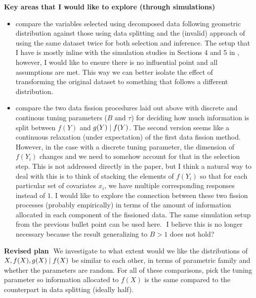 \textbf{Key areas that I would like to explore (through simulations)}
\begin{itemize}
\item compare the variables selected using decomposed data following geometric distribution against those using data splitting and the (invalid) approach of using the same dataset twice for both selection and inference. The setup that I have is mostly inline with the simulation studies in Sections 4 and 5 in \cite{leiner2022data}, however, I would like to ensure there is no influential point and all assumptions are met. This way we can better isolate the effect of transforming the original dataset to something that follows a different distribution.
\item compare the two data fission procedures laid out above with discrete and continous tuning parameters ($B$ and $\tau$) for deciding how much information is split between $f(Y)$ and $g(Y)\mid f(Y)$. The second version seems like a continuous relaxation (under expectation) of the first data fission method. However, in the case with a discrete tuning parameter, the dimension of $f(Y_i)$ changes and we need to somehow account for that in the selection step. This is not addressed directly in the paper, but I think a natural way to deal with this is to think of stacking the elements of $f(Y_i)$ so that for each particular set of covariates $x_i$, we have multiple corresponding responses instead of $1$. I would like to explore the connection between these two fission processes (probably empirically) in terms of the amount of information allocated in each component of the fissioned data. The same simulation setup from the previous bullet point can be used here.
\newline $ $
\color{red} 
I believe this is no longer necessary because the result generalizing to $B>1$ does not hold?
\color{black}
\end{itemize}
\textbf{Revised plan}
\newline $ $
We investigate to what extent would we like the distributions of $X, f(X), g(X)\mid f(X)$ be similar to each other, in terms of parametric family and whether the parameters are random. For all of these comparisons, pick the tuning parameter so information allocated to $f(X)$ is the same compared to the counterpart in data splitting (ideally half).
